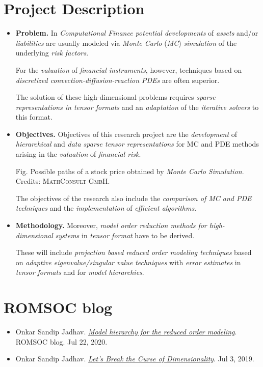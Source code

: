 \documentclass{book}
\numberwithin{equation}{section}
\begin{document}
\section{Project Description}
\begin{itemize}
    \item \textbf{Problem.} In \textit{Computational Finance potential developments} of \textit{assets} and/or \textit{liabilities} are usually modeled via \textit{Monte Carlo} (\textit{MC}) \textit{simulation} of the underlying \textit{risk factors}.
    
    For the \textit{valuation} of \textit{financial instruments}, however, techniques based on \textit{discretized convection-diffusion-reaction PDEs} are often superior.
    
    The solution of these high-dimensional problems requires \textit{sparse representations in tensor formats} and an \textit{adaptation} of the \textit{iterative solvers} to this format.
    \item \textbf{Objectives.} Objectives of this research project are the \textit{development} of \textit{hierarchical} and \textit{data sparse tensor representations} for MC and PDE methods arising in the \textit{valuation} of \textit{financial risk}.
    
    \textsf{Fig. Possible paths of a stock price obtained by \textit{Monte Carlo Simulation}. Credits: \textsc{MathConsult GmbH}.}
    
    The objectives of the research also include the \textit{comparison of MC and PDE techniques} and the \textit{implementation} of \textit{efficient algorithms}.
    \item \textbf{Methodology.} Moreover, \textit{model order reduction methods for high-dimensional systems} in \textit{tensor format} have to be derived.
    
    These will include \textit{projection based reduced order modeling techniques} based on \textit{adaptive eigenvalue/singular value techniques} with \textit{error estimates} in \textit{tensor formats} and for \textit{model hierarchies}.
\end{itemize}

\section{ROMSOC blog}
\begin{itemize}
    \item Onkar Sandip Jadhav. \href{https://www.romsoc.eu/model-hierarchy-for-the-reduced-order-modelling/}{\textit{Model hierarchy for the reduced order modeling}}. ROMSOC blog. Jul 22, 2020.
    \item Onkar Sandip Jadhav. \href{https://www.romsoc.eu/lets-break-the-curse-of-dimensionality/}{\textit{Let's Break the Curse of Dimensionality}}. Jul 3, 2019.
\end{itemize}
\end{document}
